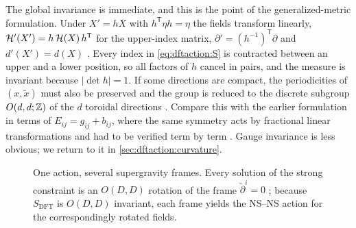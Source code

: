 The global invariance is immediate, and this is the point of the generalized-metric formulation.
Under $X'=hX$ with $h^{\mathsf T}\eta h=\eta$ the fields transform linearly,
$\mathcal{H}'(X')=h\,\mathcal{H}(X)\,h^{\mathsf T}$ for the upper-index matrix, $\partial'=(h^{-1})^{\mathsf T}
\partial$ and $d'(X')=d(X)$ . Every index in
\eqref{eq:dftaction:S} is contracted between an upper and a lower position, so all factors of
$h$ cancel in pairs, and the measure is invariant because $|\det h|=1$. If some directions are
compact, the periodicities of $(x,\tilde x)$ must also be preserved and the group is reduced to
the discrete subgroup $O(d,d;\mathbb{Z})$ of the $d$ toroidal directions .
Compare this with the earlier formulation in terms of $E_{ij}=g_{ij}+b_{ij}$, where the same
symmetry acts by fractional linear transformations and had to be verified term by term
. Gauge invariance is less
obvious; we return to it in \cref{sec:dftaction:curvature}.

\begin{figure}[ht]
\centering
{}
\caption{One action, several supergravity frames. Every solution of the strong constraint is an
$O(D,D)$ rotation of the frame $\tilde\partial^i=0$ ; because $S_{\text{DFT}}$ is $O(D,D)$
invariant, each frame yields the NS--NS action for the correspondingly rotated fields.}
\label{fig:dftaction:frames}
\end{figure}

